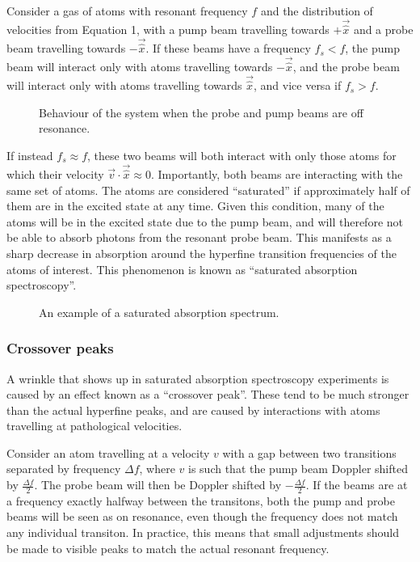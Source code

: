 \documentclass[11pt,twoside,a4paper]{article}
\begin{document}
Consider a gas of atoms with resonant frequency \(f\) and the distribution of velocities from Equation 1, with a pump beam travelling towards \(+\vec{\hat{x}}\) and a probe beam travelling towards \(-\vec{\hat{x}}\). If these beams have a frequency \(f_s<f\), the pump beam will interact only with
atoms travelling towards \(-\vec{\hat{x}}\), and the probe beam will interact only with atoms travelling towards \(\vec{\hat{x}}\), and vice versa if \(f_s>f\).
\begin{figure}[h]
    \centering
    \caption{Behaviour of the system when the probe and pump beams are off resonance.}    
\end{figure}

If instead \(f_s\approx f\), these two beams will both interact with only those atoms for which their velocity \(\vec{v}\cdot\vec{\hat{x}}\approx 0\). Importantly, both beams are interacting with the same set of atoms. The atoms are considered ``saturated'' if approximately half of them are in the
excited state at any time. Given this condition, many of the atoms will be in the excited state due to the pump beam, and will therefore not be able to absorb photons from the resonant probe beam. This manifests as a sharp decrease in absorption around the hyperfine transition frequencies of the atoms of interest.
This phenomenon is known as ``saturated absorption spectroscopy''.
\begin{figure}[h]
    \centering
    \caption{An example of a saturated absorption spectrum.}
\end{figure}
\subsubsection{Crossover peaks}
A wrinkle that shows up in saturated absorption spectroscopy experiments is caused by an effect known as a ``crossover peak''. These tend to be much stronger than the actual hyperfine peaks, and are caused by interactions with atoms travelling at pathological velocities.

Consider an atom travelling at a velocity \(v\) with a gap between two transitions separated by frequency \(\Delta f\), where \(v\) is such that the pump beam Doppler shifted by \(\frac{\Delta f}{2}\). The probe beam will then be Doppler shifted by \(-\frac{\Delta f}{2}\). If the beams are at a frequency exactly halfway
between the transitons, both the pump and probe beams will be seen as on resonance, even though the frequency does not match any individual transiton. In practice, this means that small adjustments should be made to visible peaks to match the actual resonant frequency.
\end{document}

